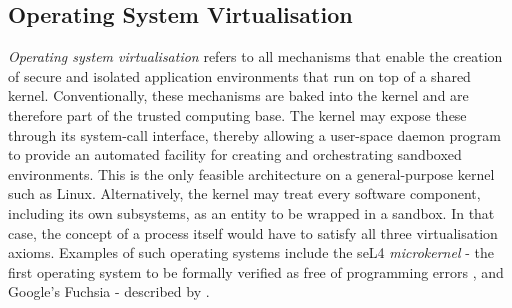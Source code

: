 \subsection{Operating System Virtualisation}
\label{ch:fundamentals/virtualisation/os-virtualisation}
\textit{Operating system virtualisation} refers to all mechanisms that enable the creation of secure
and isolated application environments that run on top of a shared kernel. 
Conventionally, these mechanisms are baked into the kernel and are therefore part of the trusted computing base.
The kernel may expose these through its system-call interface, thereby allowing a user-space daemon 
program to provide an automated facility for creating and orchestrating sandboxed environments. 
This is the only feasible architecture on a general-purpose kernel such as Linux. 
Alternatively, the kernel may treat every software component, including its own subsystems, as an entity
to be wrapped in a sandbox. In that case, the concept of a process itself would have to 
satisfy all three virtualisation axioms. Examples of such operating systems include the seL4 \textit{microkernel}
- the first operating system to be formally verified as free of programming errors \cite{10.1145/1629575.1629596}, 
and Google's Fuchsia - described by \textcite{10.22667/JOWUA.2021.09.30.047}.

